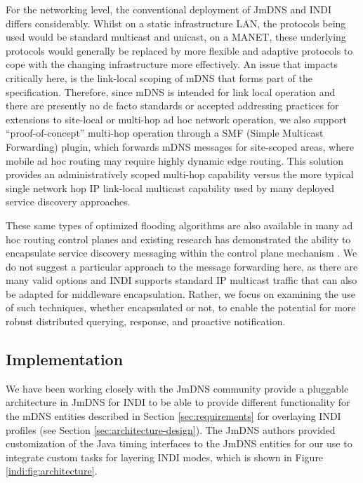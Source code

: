 For the networking level, the conventional deployment of JmDNS and INDI differs considerably. Whilst on a static infrastructure LAN, the protocols being used would be standard multicast and unicast, on a MANET, these underlying protocols would generally be replaced by more flexible and adaptive protocols to cope with the changing infrastructure more effectively. An issue that impacts critically here, is the link-local scoping of  mDNS that forms part of the specification.   Therefore, since mDNS is intended for link local operation and there are presently no de facto standards or accepted addressing practices for extensions to site-local or multi-hop ad hoc network operation, we also support ``proof-of-concept'' multi-hop operation through a SMF (Simple Multicast Forwarding) \cite{macker2004simplified} plugin, which forwards mDNS messages for site-scoped  areas, where mobile ad hoc routing may require highly dynamic edge routing.  This solution provides an administratively scoped multi-hop capability versus the more typical single network hop IP link-local multicast capability used by many deployed service discovery approaches.  

These same types of optimized flooding algorithms are also available in many ad hoc routing control planes and existing research has demonstrated the ability to encapsulate service discovery messaging within the control plane mechanism \cite{li-lightweight}. We do not suggest a particular approach to the message forwarding here, as there are many valid options and INDI supports standard IP multicast traffic that can also be adapted for middleware encapsulation.  Rather, we focus on examining the use of such techniques, whether encapsulated or not, to enable the potential for more robust distributed querying, response, and proactive notification.


\subsection{Implementation}
\label{sec:implementation}

We have been working closely with the JmDNS community \cite{jmdns} provide a pluggable architecture in JmDNS for INDI to be able to provide different functionality for the mDNS entities described in Section \ref{sec:requirements} for overlaying INDI profiles (see Section \ref{sec:architecture-design}).  The JmDNS \cite{jmdns} authors provided customization of the Java timing interfaces to the JmDNS entities for our use to integrate custom tasks for layering INDI modes, which is shown in Figure  \ref{indi:fig:architecture}.   
    
